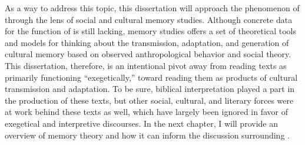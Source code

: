 As a way to address this topic, this dissertation will approach the phenomenon of \rwb through the lens of social and cultural memory studies. Although concrete data for the function of \rwb is still lacking, memory studies offers a set of theoretical tools and models for thinking about the transmission, adaptation, and generation of cultural memory based on observed anthropological behavior and social theory. This dissertation, therefore, is an intentional pivot away from reading \rwb texts as primarily functioning ``exegetically,'' toward reading them as products of cultural transmission and adaptation. To be sure, biblical interpretation played a part in the production of these texts, but other social, cultural, and literary forces were at work behind these texts as well, which have largely been ignored in favor of exegetical and interpretive discourses. In the next chapter, I will provide an overview of memory theory and how it can inform the discussion surrounding \rwb.


